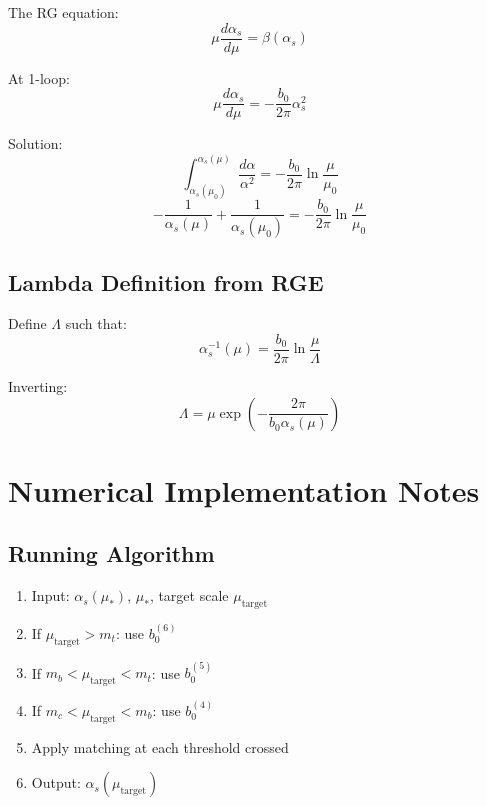 \documentclass[11pt,a4paper]{article}
\theoremstyle{definition}
\begin{document}
The RG equation:
\begin{equation}
\label{eq:rge}
\mu\frac{d\alpha_s}{d\mu} = \beta(\alpha_s)
\end{equation}

At 1-loop:
\begin{equation}
\label{eq:rge-1loop}
\mu\frac{d\alpha_s}{d\mu} = -\frac{b_0}{2\pi}\alpha_s^2
\end{equation}

Solution:
\begin{equation}
\label{eq:rge-solution}
\int_{\alpha_s(\mu_0)}^{\alpha_s(\mu)} \frac{d\alpha}{\alpha^2} = -\frac{b_0}{2\pi}\ln\frac{\mu}{\mu_0}
\end{equation}
\begin{equation}
\label{eq:rge-solution-2}
-\frac{1}{\alpha_s(\mu)} + \frac{1}{\alpha_s(\mu_0)} = -\frac{b_0}{2\pi}\ln\frac{\mu}{\mu_0}
\end{equation}

\subsection{Lambda Definition from RGE}
\label{subsec:lambda-rge}

Define $\Lambda$ such that:
\begin{equation}
\label{eq:lambda-rge-def}
\alpha_s^{-1}(\mu) = \frac{b_0}{2\pi}\ln\frac{\mu}{\Lambda}
\end{equation}

Inverting:
\begin{equation}
\label{eq:lambda-from-alpha}
\Lambda = \mu \exp\left(-\frac{2\pi}{b_0\alpha_s(\mu)}\right)
\end{equation}

\section{Numerical Implementation Notes}
\label{app:numerical}

\subsection{Running Algorithm}
\label{subsec:algorithm}

\begin{enumerate}
  \item Input: $\alpha_s(\mu_*)$, $\mu_*$, target scale $\mu_{\text{target}}$
  \item If $\mu_{\text{target}} > m_t$: use $b_0^{(6)}$
  \item If $m_b < \mu_{\text{target}} < m_t$: use $b_0^{(5)}$
  \item If $m_c < \mu_{\text{target}} < m_b$: use $b_0^{(4)}$
  \item Apply matching at each threshold crossed
  \item Output: $\alpha_s(\mu_{\text{target}})$
\end{enumerate}
\end{document}
